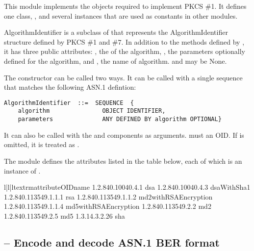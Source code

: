\documentclass{howto}
\begin{document}
This module implements the  objects required
to implement PKCS \#1.  It defines one class,
, and several instances that are used as
constants in other modules.

\begin{classdesc}{AlgorithmIdentifier}{}
 is a subclass of 
that represents the AlgorithmIdentifier structure defined by PKCS \#1
and \#7.  In addition to the methods defined by , it
has three public attributes: , the 
of the algorithm, , the parameters optionally defined
for the algorithm, and , the name of algorithm.
 and  may be None.

The constructor can be called two ways.  It can be called with a
single sequence that matches the following ASN.1 defintion:
\begin{verbatim}
AlgorithmIdentifier  ::=  SEQUENCE  {
    algorithm               OBJECT IDENTIFIER,
    parameters              ANY DEFINED BY algorithm OPTIONAL}
\end{verbatim}
It can also be called with the  and 
components as arguments.   must an OID.  If
 is omitted, it is treated as .
\end{classdesc}

The module defines the attributes listed in the table below, each of
which is an instance of .

\begin{tableiii}{l|l|l}{textrm}{attribute}{OID}{name}
        {1.2.840.10040.4.1}    {dsa}
   {1.2.840.10040.4.3}    {dsaWithSha1}
        {1.2.840.113549.1.1.1} {rsa}
    {1.2.840.113549.1.1.2} {md2withRSAEncryption}
    {1.2.840.113549.1.1.4} {md5withRSAEncryption}
        {1.2.840.113549.2.2}   {md2}
        {1.2.840.113549.2.5}   {md5}
        {1.3.14.3.2.26}        {sha}
\end{tableiii}

\subsection{
	-- Encode and decode ASN.1 BER format}
\end{document}
